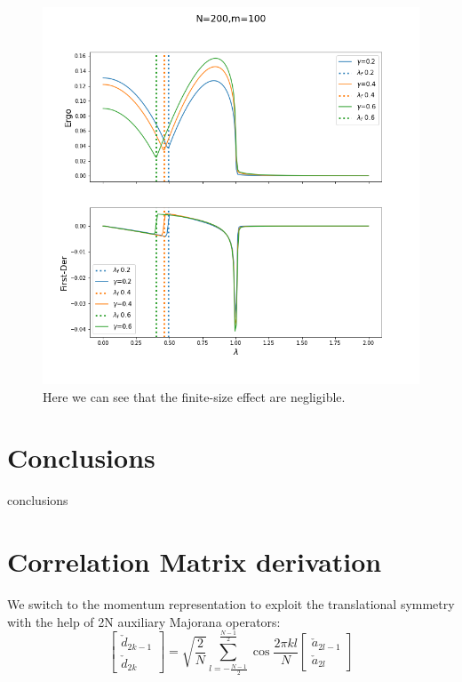 \documentclass[12pt,a4paper]{book}
\theoremstyle{definition}
\begin{document}
\begin{figure}[h]
	\centering
	\includegraphics[width=0.7\linewidth]{graphs/N200_m100_simbreak_g_020406}
	\caption{Here we can see that the finite-size effect are negligible. }
	\label{fig:n200m100simbreakg020406}
\end{figure}

\chapter{Conclusions}
conclusions
\clearpage
\appendix
\chapter{Correlation Matrix derivation}\label{appendixcalculation}
We switch to the momentum representation to exploit the translational symmetry with the help of 2N auxiliary Majorana operators:
\begin{equation}\label{eq:ddefinition}\left[\begin{array}{c}
		\check{d}_{2 k-1} \\
		\check{d}_{2 k}
	\end{array}\right]=\sqrt{\frac{2}{N}} \sum_{l=-\frac{N-1}{2}}^{\frac{N-1}{2}} \cos \frac{2 \pi k l}{N}\left[\begin{array}{c}
		\check{a}_{2 l-1} \\
		\check{a}_{2 l}
	\end{array}\right]\end{equation}
\end{document}
